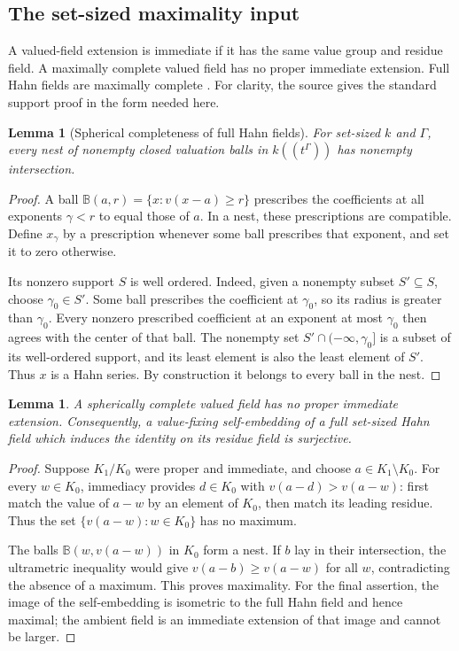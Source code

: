 \documentclass[11pt]{article}
\newtheorem{lemma}[theorem]{Lemma}
\theoremstyle{definition}
\theoremstyle{remark}
\numberwithin{equation}{section}
\begin{document}
\subsection{The set-sized maximality input}

A valued-field extension is immediate if it has the same value group and residue
field. A maximally complete valued field has no proper immediate extension. Full
Hahn fields are maximally complete \cite[Theorem~1]{Poonen}. For clarity, the
source gives the standard support proof in the form needed here.

\begin{lemma}[Spherical completeness of full Hahn fields]\label{saut:fs:lem:spherical}
For set-sized $k$ and $\Gamma$, every nest of nonempty closed valuation balls in
$k((t^\Gamma))$ has nonempty intersection.
\end{lemma}
\begin{proof}
A ball $\mathbb B(a,r)=\{x:v(x-a)\ge r\}$ prescribes the coefficients at all
exponents $\gamma<r$ to equal those of $a$. In a nest, these prescriptions are
compatible. Define $x_\gamma$ by a prescription whenever some ball prescribes that
exponent, and set it to zero otherwise.

Its nonzero support $S$ is well ordered. Indeed, given a nonempty subset
$S'\subseteq S$, choose $\gamma_0\in S'$. Some ball prescribes the coefficient at
$\gamma_0$, so its radius is greater than $\gamma_0$. Every nonzero prescribed
coefficient at an exponent at most $\gamma_0$ then agrees with the center of that
ball. The nonempty set $S'\cap(-\infty,\gamma_0]$ is a subset of its well-ordered
support, and its least element is also the least element of $S'$. Thus $x$ is a
Hahn series. By construction it belongs to every ball in the nest.
\end{proof}

\begin{lemma}\label{saut:fs:lem:immediate}
A spherically complete valued field has no proper immediate extension.
Consequently, a value-fixing self-embedding of a full set-sized Hahn field which
induces the identity on its residue field is surjective.
\end{lemma}
\begin{proof}
Suppose $K_1/K_0$ were proper and immediate, and choose $a\in K_1\setminus K_0$. For
every $w\in K_0$, immediacy provides $d\in K_0$ with $v(a-d)>v(a-w)$: first match
the value of $a-w$ by an element of $K_0$, then match its leading residue. Thus the
set $\{v(a-w):w\in K_0\}$ has no maximum.

The balls $\mathbb B(w,v(a-w))$ in $K_0$ form a nest. If $b$ lay in their
intersection, the ultrametric inequality would give $v(a-b)\ge v(a-w)$ for all $w$,
contradicting the absence of a maximum. This proves maximality. For the final
assertion, the image of the self-embedding is isometric to the full Hahn field and
hence maximal; the ambient field is an immediate extension of that image and cannot
be larger.
\end{proof}
\end{document}
